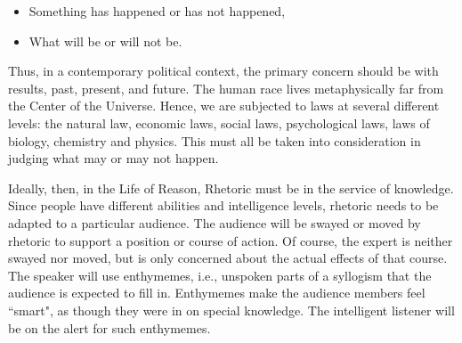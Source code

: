 \begin{itemize}
\item Something has happened or has not happened, 
\item What will be or will not be. 
\end{itemize}
Thus, in a contemporary political context, the primary concern should be with results, past, present, and future. The human race lives metaphysically far from the Center of the Universe. Hence, we are subjected to laws at several different levels: the natural law, economic laws, social laws, psychological laws, laws of biology, chemistry and physics. This must all be taken into consideration in judging what may or may not happen.

Ideally, then, in the Life of Reason, Rhetoric must be in the service of knowledge. Since people have different abilities and intelligence levels, rhetoric needs to be adapted to a particular audience. The audience will be swayed or moved by rhetoric to support a position or course of action. Of course, the expert is neither swayed nor moved, but is only concerned about the actual effects of that course. The speaker will use enthymemes, i.e., unspoken parts of a syllogism that the audience is expected to fill in. Enthymemes make the audience members feel ``smart", as though they were in on special knowledge. The intelligent listener will be on the alert for such enthymemes.

